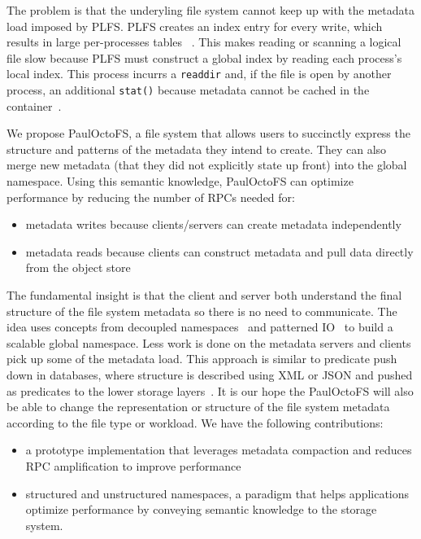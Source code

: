 The problem is that the underyling file system cannot keep up with the metadata
load imposed by PLFS. PLFS creates an index entry for every write, which
results in large per-processes tables ~\cite{grider:pc17-diddlings}. This makes
reading or scanning a logical file slow because PLFS must construct a global
index by reading each process's local index. This process incurrs a
\texttt{readdir} and, if the file is open by another process, an additional
\texttt{stat()} because metadata cannot be cached in the
container~\cite{bent_plfs_2009}.

We propose PaulOctoFS, a file system that allows users to succinctly express
the structure and patterns of the metadata they intend to create.  They can
also merge new metadata (that they did not explicitly state up front) into the
global namespace.  Using this semantic knowledge, PaulOctoFS can optimize
performance by reducing the number of RPCs needed for:

\begin{itemize}

  \item metadata writes because clients/servers can create metadata
  independently

  \item metadata reads because clients can construct metadata and pull data
  directly from the object store

\end{itemize}

The fundamental insight is that the client and server both understand the final
structure of the file system metadata so there is no need to communicate.  The
idea uses concepts from decoupled namespaces~\cite{zheng:pdsw2014-batchfs,
zheng:pdsw2015-deltafs} and patterned IO~\cite{he:hpdc13-plfs-patterns} to
build a scalable global namespace. Less work is done on the metadata servers
and clients pick up some of the metadata load.  This approach is similar to
predicate push down in databases, where structure is described using XML or
JSON and pushed as predicates to the lower storage
layers~\cite{shel:pc17-pushdown}. It is our hope the PaulOctoFS will also be
able to change the representation or structure of the file system metadata
according to the file type or workload.  We have the following contributions:

\begin{itemize}

  \item a prototype implementation that leverages metadata compaction and
  reduces RPC amplification to improve performance

  \item structured and unstructured namespaces, a paradigm that helps
  applications optimize performance by conveying semantic knowledge to the
  storage system.

\end{itemize}
